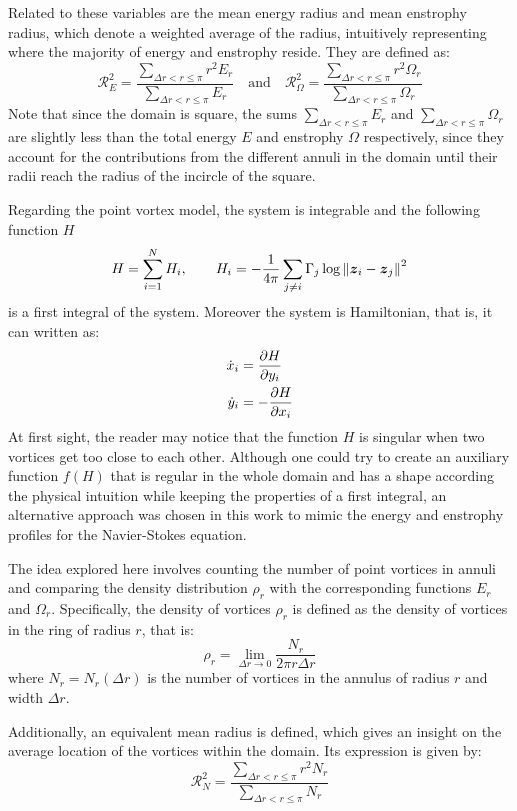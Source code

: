 \documentclass[../main.tex]{subfiles}
\begin{document}
Related to these variables are the mean energy radius and mean enstrophy radius, which denote a weighted average of the radius, intuitively representing where the majority of energy and enstrophy reside. They are defined as:
\begin{equation}
	\mathcal{R}_E^2      = \frac{\sum_{\Delta r<r\leq \pi} r^2 E_r}{\sum_{\Delta r<r\leq \pi} E_r}\quad \text{and}  \quad
	\mathcal{R}_\Omega^2 = \frac{\sum_{\Delta r<r\leq \pi} r^2 \Omega_r}{\sum_{\Delta r<r\leq \pi} \Omega_r}
\end{equation}
Note that since the domain is square, the sums $\sum_{\Delta r<r\leq \pi}  E_r$ and $\sum_{\Delta r<r\leq \pi}  \Omega_r$ are slightly less than the total energy $E$ and enstrophy $\Omega$ respectively, since they account for the contributions from the different annuli in the domain until their radii reach the radius of the incircle of the square.

Regarding the point vortex model, the system is integrable and the following function $H$
\begin{equation}
	H = \sum_{i=1}^{N} H_i,\qquad H_i = -\frac{1}{4\pi} \sum_{j\neq i} \Gamma_j \log{\left\|\boldsymbol{z}_i-\boldsymbol{z}_j\right\|^2}
\end{equation}
is a first integral of the system. Moreover the system is Hamiltonian, that is, it can written as:
\begin{align}
	\dot{x}_i & = \pdv{H}{y_i}  \\
	\dot{y}_i & = -\pdv{H}{x_i}
\end{align}
At first sight, the reader may notice that the function $H$ is singular when two vortices get too close to each other. Although one could try to create an auxiliary function $f(H)$ that is regular in the whole domain and has a shape according the physical intuition while keeping the properties of a first integral, an alternative approach was chosen in this work to mimic the energy and enstrophy profiles for the Navier-Stokes equation.

The idea explored here involves counting the number of point vortices in annuli and comparing the density distribution $\rho_r$ with the corresponding functions $E_r$ and $\Omega_r$. Specifically, the density of vortices $\rho_r$ is defined as the density of vortices in the ring of radius $r$, that is:
\begin{equation}
	\rho_r = \lim_{\Delta r \to 0} \frac{N_r}{2 \pi r \Delta r}
\end{equation}
where $N_r=N_r(\Delta r)$ is the number of vortices in the annulus of radius $r$ and width $\Delta r$.

Additionally, an equivalent mean radius is defined, which gives an insight on the average location of the vortices within the domain. Its expression is given by:
\begin{equation}\label{eq:meanradius_vortices}
	\mathcal{R}_N^2 = \frac{\sum_{\Delta r<r\leq \pi} r^2 N_r}{\sum_{\Delta r<r\leq \pi} N_r}
\end{equation}
\end{document}
